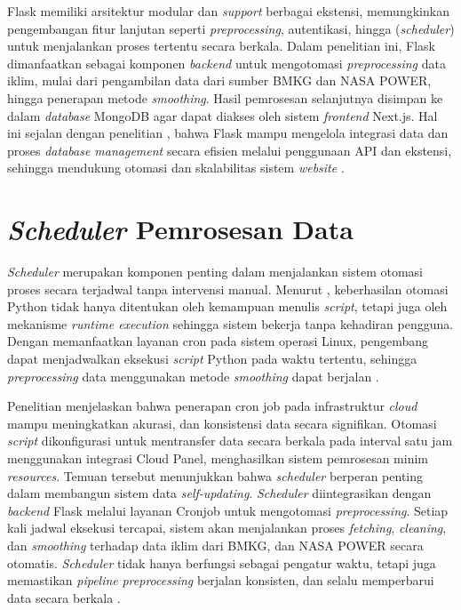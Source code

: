 Flask memiliki arsitektur modular dan \textit{support} berbagai ekstensi,  memungkinkan pengembangan fitur lanjutan seperti \textit{preprocessing}, autentikasi, hingga (\textit{scheduler}) untuk menjalankan proses tertentu secara berkala. Dalam penelitian ini, Flask dimanfaatkan sebagai komponen \textit{backend}  untuk mengotomasi \textit{preprocessing} data iklim, mulai dari pengambilan data dari sumber BMKG dan NASA POWER, hingga penerapan metode \textit{smoothing}. Hasil pemrosesan selanjutnya disimpan ke dalam \textit{database} MongoDB agar dapat diakses oleh sistem \textit{frontend} Next.js. 
Hal ini sejalan dengan penelitian \cite{singh2019}, bahwa Flask mampu mengelola integrasi data dan proses \textit{database management} secara efisien melalui penggunaan API dan ekstensi, sehingga mendukung otomasi dan skalabilitas sistem \textit{website} \citep{singh2019}.

\section{\textit{Scheduler} Pemrosesan Data}
\textit{Scheduler} merupakan komponen penting dalam menjalankan sistem otomasi proses secara terjadwal tanpa intervensi manual. Menurut \cite{choi2021}, keberhasilan otomasi Python tidak hanya ditentukan oleh kemampuan menulis \textit{script}, tetapi juga oleh mekanisme \textit{runtime execution} sehingga sistem bekerja tanpa kehadiran pengguna. Dengan memanfaatkan layanan cron pada sistem operasi Linux, pengembang dapat menjadwalkan eksekusi \textit{script} Python pada waktu tertentu, sehingga \textit{preprocessing} data menggunakan metode \textit{smoothing} dapat berjalan \citep{choi2021}.

Penelitian \cite{wibowo2025} menjelaskan bahwa penerapan cron job pada infrastruktur \textit{cloud} mampu meningkatkan akurasi, dan konsistensi data secara signifikan. Otomasi \textit{script} dikonfigurasi untuk mentransfer data secara berkala pada interval satu jam menggunakan integrasi Cloud Panel, menghasilkan sistem pemrosesan minim \textit{resources}. Temuan tersebut menunjukkan bahwa \textit{scheduler} berperan penting dalam membangun sistem data \textit{self-updating}. \textit{Scheduler} diintegrasikan dengan \textit{backend} Flask melalui layanan Cronjob untuk mengotomasi \textit{preprocessing}. Setiap kali jadwal eksekusi tercapai, sistem akan menjalankan proses \textit{fetching}, \textit{cleaning}, dan \textit{smoothing} terhadap data iklim dari BMKG, dan NASA POWER secara otomatis. 
\textit{Scheduler} tidak hanya berfungsi sebagai pengatur waktu, tetapi juga memastikan \textit{pipeline} \textit{preprocessing} berjalan konsisten, dan selalu memperbarui data secara berkala \citep{wibowo2025}.

